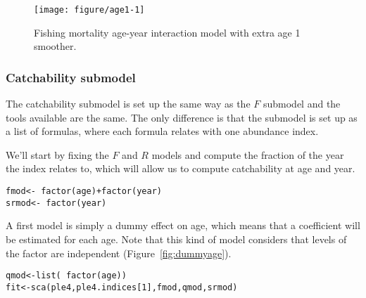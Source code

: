 \documentclass[a4paper,english,10pt]{article}\usepackage[]{graphicx}\usepackage[]{color}
\makeatletter
\def\maxwidth{ %
  \ifdim\Gin@nat@width>\linewidth
    \linewidth
  \else
    \Gin@nat@width
  \fi
}
\newcommand{\hlnum}[1]{\textcolor[rgb]{0.2,0.2,0.2}{#1}}%
\newcommand{\hlopt}[1]{\textcolor[rgb]{0.2,0.2,0.2}{#1}}%
\newcommand{\hlstd}[1]{\textcolor[rgb]{0,0,0}{#1}}%
\newcommand{\hlkwb}[1]{\textcolor[rgb]{0.361,0.506,0.596}{#1}}%
\newcommand{\hlkwd}[1]{\textcolor[rgb]{0.361,0.506,0.596}{#1}}%
\newenvironment{kframe}{%
 \def\at@end@of@kframe{}%
 \ifinner\ifhmode%
  \def\at@end@of@kframe{\end{minipage}}%
  \begin{minipage}{\columnwidth}%
 \fi\fi%
 \def\FrameCommand##1{\hskip\@totalleftmargin \hskip-\fboxsep
 \colorbox{shadecolor}{##1}\hskip-\fboxsep
     \hskip-\linewidth \hskip-\@totalleftmargin \hskip\columnwidth}%
 \MakeFramed {\advance\hsize-\width
   \@totalleftmargin\z@ \linewidth\hsize
   \@setminipage}}%
 {\par\unskip\endMakeFramed%
 \at@end@of@kframe}
\newenvironment{knitrout}{}{} %
\makeatother
\begin{document}
\begin{knitrout}
\color{fgcolor}\begin{figure}[H]

{\centering \texttt{[image: figure/age1-1]} 

}

\caption[Fishing mortality age-year interaction model with extra age 1 smoother]{Fishing mortality age-year interaction model with extra age 1 smoother.}\label{fig:age1}
\end{figure}


\end{knitrout}

\subsubsection{Catchability submodel}

The catchability submodel is set up the same way as the $F$ submodel and the tools available are the same. The only difference is that the submodel is set up as a list of formulas, where each formula relates with one abundance index.

We'll start by fixing the $F$ and $R$ models and compute the fraction of the year the index relates to, which will allow us to compute catchability at age and year. 

\begin{knitrout}
\color{fgcolor}\begin{kframe}
\begin{alltt}
\hlstd{fmod} \hlkwb{<-} \hlopt{~} \hlkwd{factor}\hlstd{(age)} \hlopt{+} \hlkwd{factor}\hlstd{(year)}
\hlstd{srmod} \hlkwb{<-} \hlopt{~} \hlkwd{factor}\hlstd{(year)}
\end{alltt}
\end{kframe}
\end{knitrout}

A first model is simply a dummy effect on age, which means that a coefficient will be estimated for each age. Note that this kind of model considers that levels of the factor are independent (Figure~\ref{fig:dummyage}).

\begin{knitrout}
\color{fgcolor}\begin{kframe}
\begin{alltt}
\hlstd{qmod} \hlkwb{<-} \hlkwd{list}\hlstd{(}\hlopt{~} \hlkwd{factor}\hlstd{(age))}
\hlstd{fit} \hlkwb{<-} \hlkwd{sca}\hlstd{(ple4, ple4.indices[}\hlnum{1}\hlstd{], fmod, qmod, srmod)}
\end{alltt}
\end{kframe}
\end{knitrout}
\end{document}
